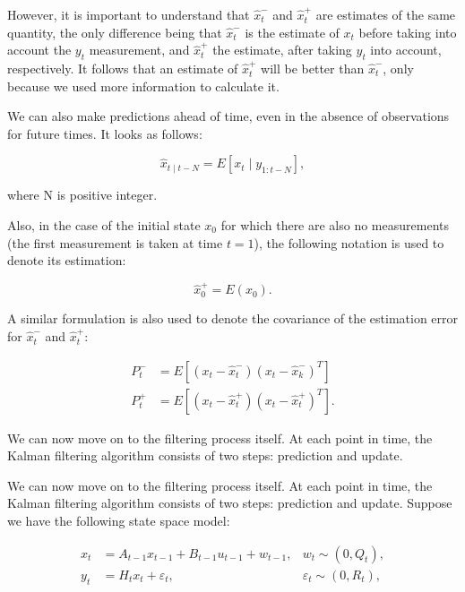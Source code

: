 However, it is important to understand that \(\hat{x}_t^{-}\) and \(\hat{x}_t^{+}\) are estimates of the same quantity, the only difference being that \(\hat{x}_t^{-}\) is the estimate of \(x_t\) before taking into account the \(y_t\) measurement, and \(\hat{x}_t^{+}\) the estimate, after taking \(y_t\) into account, respectively.  It follows that an estimate of \(\hat{x}_t^{+}\) will be better than \(\hat{x}_t^{-}\), only because we used more information to calculate it.

We can also make predictions ahead of time, even in the absence of observations for future times. It looks as follows:

\begin{equation}
    \hat{x}_{t \mid t-N}=E\left[x_t \mid y_{1:t-N}\right],
\end{equation}

\noindent where N is positive integer.

Also, in the case of the initial state \(x_0\) for which there are also no measurements (the first measurement is taken at time \(t = 1\)), the following notation is used to denote its estimation:

\begin{equation}
\hat{x}_0^{+}=E\left(x_0\right).
\end{equation}

A similar formulation is also used to denote the covariance of the estimation error for \(\hat{x}_t^{-}\) and \(\hat{x}_t^{+}\):

\begin{subequations}
\begin{align}
    P_t^{-}&=E\left[\left(x_t-\hat{x}_t^{-}\right)\left(x_t-\hat{x}_k^{-}\right)^T\right] \\
    P_t^{+}&=E\left[\left(x_t-\hat{x}_t^{+}\right)\left(x_t-\hat{x}_t^{+}\right)^T\right].
\end{align}
\end{subequations}

We can now move on to the filtering process itself. At each point in time, the Kalman filtering algorithm consists of two steps: prediction and update.

We can now move on to the filtering process itself. At each point in time, the Kalman filtering algorithm consists of two steps: prediction and update. Suppose we have the following state space model:

\begin{subequations}
\begin{align}
x_t &= A_{t-1} x_{t-1} + B_{t-1} u_{t-1} + w_{t-1}, &w_t \sim (0, Q_t), \label{eq:kf_example_state_equation} \\
y_t &= H_t x_t + \varepsilon_t, &\varepsilon_t \sim (0, R_t), \label{} \label{eq:kf_example_measurement_equation}
\end{align}
\label{eq:kf_example_model}
\end{subequations}

